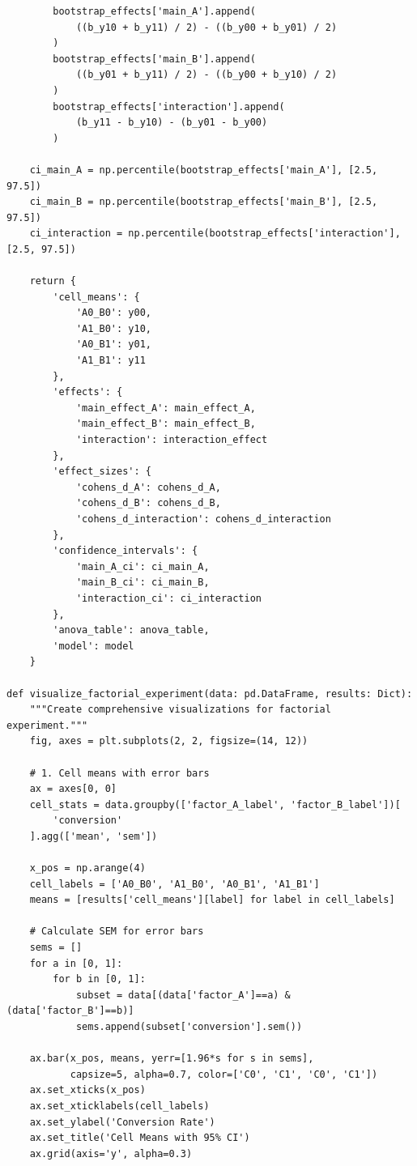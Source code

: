 \begin{lstlisting}
        bootstrap_effects['main_A'].append(
            ((b_y10 + b_y11) / 2) - ((b_y00 + b_y01) / 2)
        )
        bootstrap_effects['main_B'].append(
            ((b_y01 + b_y11) / 2) - ((b_y00 + b_y10) / 2)
        )
        bootstrap_effects['interaction'].append(
            (b_y11 - b_y10) - (b_y01 - b_y00)
        )

    ci_main_A = np.percentile(bootstrap_effects['main_A'], [2.5, 97.5])
    ci_main_B = np.percentile(bootstrap_effects['main_B'], [2.5, 97.5])
    ci_interaction = np.percentile(bootstrap_effects['interaction'], [2.5, 97.5])

    return {
        'cell_means': {
            'A0_B0': y00,
            'A1_B0': y10,
            'A0_B1': y01,
            'A1_B1': y11
        },
        'effects': {
            'main_effect_A': main_effect_A,
            'main_effect_B': main_effect_B,
            'interaction': interaction_effect
        },
        'effect_sizes': {
            'cohens_d_A': cohens_d_A,
            'cohens_d_B': cohens_d_B,
            'cohens_d_interaction': cohens_d_interaction
        },
        'confidence_intervals': {
            'main_A_ci': ci_main_A,
            'main_B_ci': ci_main_B,
            'interaction_ci': ci_interaction
        },
        'anova_table': anova_table,
        'model': model
    }

def visualize_factorial_experiment(data: pd.DataFrame, results: Dict):
    """Create comprehensive visualizations for factorial experiment."""
    fig, axes = plt.subplots(2, 2, figsize=(14, 12))

    # 1. Cell means with error bars
    ax = axes[0, 0]
    cell_stats = data.groupby(['factor_A_label', 'factor_B_label'])[
        'conversion'
    ].agg(['mean', 'sem'])

    x_pos = np.arange(4)
    cell_labels = ['A0_B0', 'A1_B0', 'A0_B1', 'A1_B1']
    means = [results['cell_means'][label] for label in cell_labels]

    # Calculate SEM for error bars
    sems = []
    for a in [0, 1]:
        for b in [0, 1]:
            subset = data[(data['factor_A']==a) & (data['factor_B']==b)]
            sems.append(subset['conversion'].sem())

    ax.bar(x_pos, means, yerr=[1.96*s for s in sems],
           capsize=5, alpha=0.7, color=['C0', 'C1', 'C0', 'C1'])
    ax.set_xticks(x_pos)
    ax.set_xticklabels(cell_labels)
    ax.set_ylabel('Conversion Rate')
    ax.set_title('Cell Means with 95% CI')
    ax.grid(axis='y', alpha=0.3)


\end{lstlisting}
